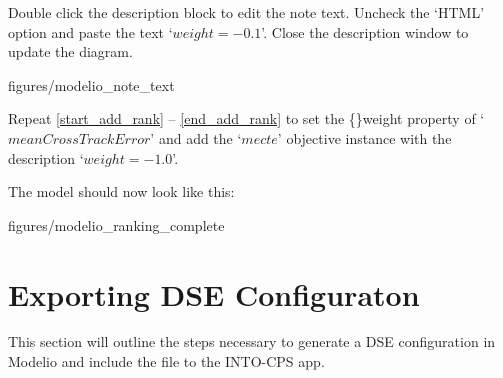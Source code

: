 \documentclass[11pt,a4paper]{../tutorial}
\begin{document}
\begin{instructions}
\newpage

\item \label{end_add_rank} Double click the description block to edit the note text. Uncheck the `HTML' option and paste the text \mbox{`$weight = -0.1$'}. Close the description window to update the diagram.

\begin{center}
\begin{annotation}[width=0.7\linewidth]{figures/modelio_note_text}
    \end{annotation}
\end{center}

\item Repeat \ref{start_add_rank} -- \ref{end_add_rank} to set the \{\}weight property of `$meanCrossTrackError$' and add the `$mecte$' objective instance with the description \mbox{`$weight = -1.0$'}.

The model should now look like this:

\begin{center}
\begin{annotation}[width=0.7\linewidth]{figures/modelio_ranking_complete}
    \end{annotation}
\end{center}


\end{instructions}

\newpage

\section{Exporting DSE Configuraton}

This section will outline the steps necessary to generate a DSE configuration in Modelio and include the file to the INTO-CPS app.
\end{document}

